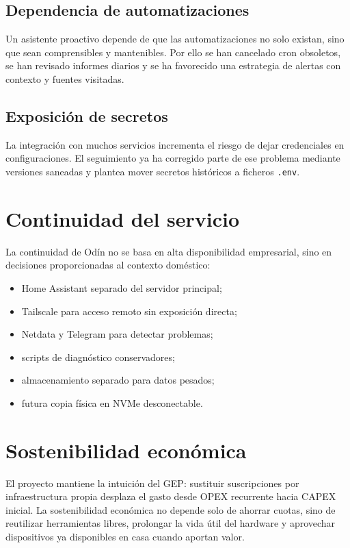 \subsection{Dependencia de automatizaciones}
Un asistente proactivo depende de que las automatizaciones no solo existan, sino que sean comprensibles y mantenibles. Por ello se han cancelado cron obsoletos, se han revisado informes diarios y se ha favorecido una estrategia de alertas con contexto y fuentes visitadas.

\subsection{Exposición de secretos}
La integración con muchos servicios incrementa el riesgo de dejar credenciales en configuraciones. El seguimiento ya ha corregido parte de ese problema mediante versiones saneadas y plantea mover secretos históricos a ficheros \texttt{.env}.

\section{Continuidad del servicio}
La continuidad de Odín no se basa en alta disponibilidad empresarial, sino en decisiones proporcionadas al contexto doméstico:
\begin{itemize}
  \item Home Assistant separado del servidor principal;
  \item Tailscale para acceso remoto sin exposición directa;
  \item Netdata y Telegram para detectar problemas;
  \item scripts de diagnóstico conservadores;
  \item almacenamiento separado para datos pesados;
  \item futura copia física en NVMe desconectable.
\end{itemize}

\section{Sostenibilidad económica}
El proyecto mantiene la intuición del GEP: sustituir suscripciones por infraestructura propia desplaza el gasto desde OPEX recurrente hacia CAPEX inicial. La sostenibilidad económica no depende solo de ahorrar cuotas, sino de reutilizar herramientas libres, prolongar la vida útil del hardware y aprovechar dispositivos ya disponibles en casa cuando aportan valor.

